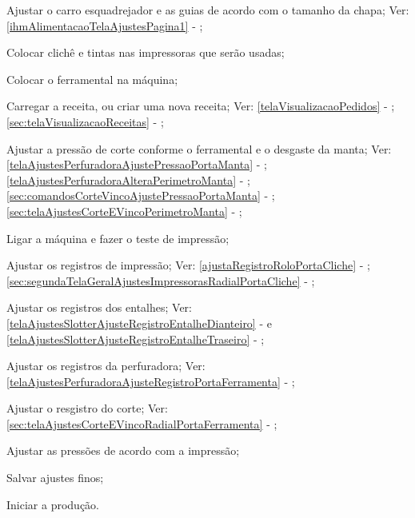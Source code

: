 \begin{procedureAdjustmentRecipe}
  \item[\ding{\dingNumber}] Ajustar o carro esquadrejador e as guias de acordo com o tamanho da chapa; Ver: \ref{ihmAlimentacaoTelaAjustesPagina1} - ;
  \item[\ding{\dingNumber}] Colocar clichê e tintas nas impressoras que serão usadas;
  \item[\ding{\dingNumber}] Colocar o ferramental na máquina;
  \item[\ding{\dingNumber}] Carregar a receita, ou criar uma nova receita; Ver: 
  \ifmachineType
  \ref{telaVisualizacaoPedidos} - ;
  \else
  \ref{sec:telaVisualizacaoReceitas} - ;
  \fi
  \item[\ding{\dingNumber}] Ajustar a pressão de corte conforme o ferramental e o desgaste da manta; Ver: 
  \ifmachineType
  \ref{telaAjustesPerfuradoraAjustePressaoPortaManta} - ;
  \ref{telaAjustesPerfuradoraAlteraPerimetroManta} - ;
  \else
  \ref{sec:comandosCorteVincoAjustePressaoPortaManta} - ;
  \ref{sec:telaAjustesCorteEVincoPerimetroManta} - ;
  \fi
  \item[\ding{\dingNumber}] Ligar a máquina e fazer o teste de impressão;
  \item[\ding{\dingNumber}] Ajustar os registros de impressão; Ver: 
  \ifmachineType
  \ref{ajustaRegistroRoloPortaCliche} - ;
  \else
  \ref{sec:segundaTelaGeralAjustesImpressorasRadialPortaCliche} - ;
  \fi
  \ifmachineType
  \item[\ding{\dingNumber}] Ajustar os registros dos entalhes; Ver: \ref{telaAjustesSlotterAjusteRegistroEntalheDianteiro} -  e \ref{telaAjustesSlotterAjusteRegistroEntalheTraseiro} - ;
  \item[\ding{\dingNumber}] Ajustar os registros da perfuradora; Ver: \ref{telaAjustesPerfuradoraAjusteRegistroPortaFerramenta} - ;
  \else
  \item[\ding{\dingNumber}] Ajustar o resgistro do corte; Ver: \ref{sec:telaAjustesCorteEVincoRadialPortaFerramenta} - ;
  \fi
  \item[\ding{\dingNumber}] Ajustar as pressões de acordo com a impressão;
  \item[\ding{\dingNumber}] Salvar ajustes finos;
  \item[\ding{\dingNumber}] Iniciar a produção.
  
\end{procedureAdjustmentRecipe}

